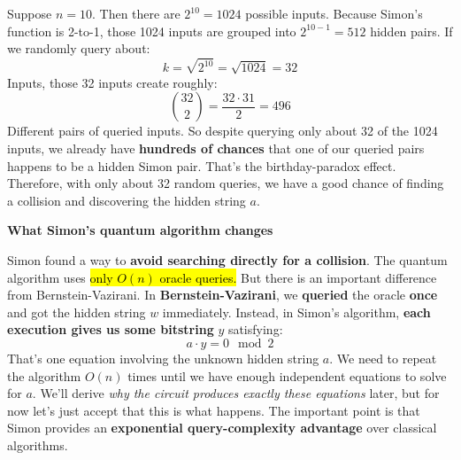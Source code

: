 \highspace
\begin{examplebox}[: $n=10$]
    Suppose $n=10$. Then there are $2^{10} = 1024$ possible inputs. Because Simon's function is 2-to-1, those 1024 inputs are grouped into $2^{10-1} = 512$ hidden pairs. If we randomly query about:
    \begin{equation*}
        k = \sqrt{2^{10}} = \sqrt{1024} = 32
    \end{equation*}
    Inputs, those 32 inputs create roughly:
    \begin{equation*}
        \binom{32}{2} = \frac{32 \cdot 31}{2} = 496
    \end{equation*}
    Different pairs of queried inputs. So despite querying only about 32 of the 1024 inputs, we already have \textbf{hundreds of chances} that one of our queried pairs happens to be a hidden Simon pair. That's the birthday-paradox effect. Therefore, with only about 32 random queries, we have a good chance of finding a collision and discovering the hidden string $a$.
\end{examplebox}

\newpage

\begin{flushleft}
    \textcolor{Green3}{ \textbf{What Simon's quantum algorithm changes}}
\end{flushleft}
Simon found a way to \textbf{avoid searching directly for a collision}. The quantum algorithm uses \hl{only $O(n)$ oracle queries.} But there is an important difference from Bernstein-Vazirani. In \textbf{Bernstein-Vazirani}, we \textbf{queried} the oracle \textbf{once} and got the hidden string $w$ immediately. Instead, in Simon's algorithm, \textbf{each execution gives us some bitstring} $y$ satisfying:
\begin{equation*}
    a \cdot y = 0 \mod 2
\end{equation*}
That's one equation involving the unknown hidden string $a$. We need to repeat the algorithm $O(n)$ times until we have enough independent equations to solve for $a$. We'll derive \emph{why the circuit produces exactly these equations} later, but for now let's just accept that this is what happens. The important point is that Simon provides an \textbf{exponential query-complexity advantage} over classical algorithms.

